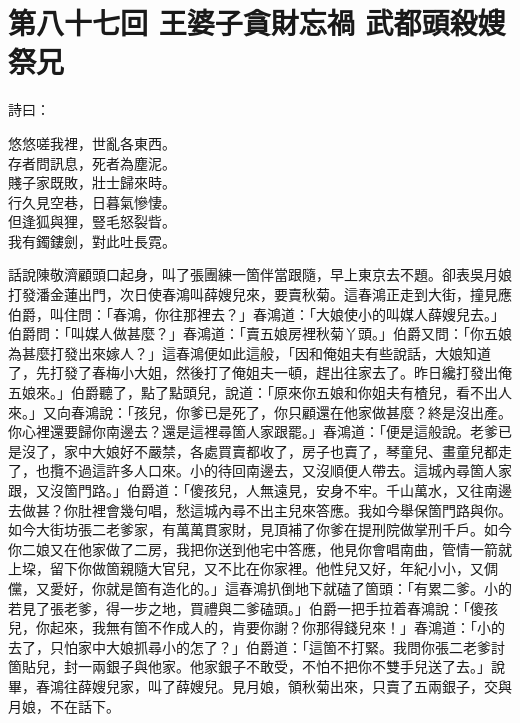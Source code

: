 
\chapter*{第八十七回 王婆子貪財忘禍 武都頭殺嫂祭兄}


詩曰：

\begin{myquote}
悠悠嗟我裡，世亂各東西。\\存者問訊息，死者為塵泥。\\賤子家既敗，壯士歸來時。\\行久見空巷，日暮氣慘悽。\\但逢狐與狸，豎毛怒裂眥。\\我有鐲鏤劍，對此吐長霓。
\end{myquote}

話說陳敬濟顧頭口起身，叫了張團練一箇伴當跟隨，早上東京去不題。卻表吳月娘打發潘金蓮出門，次日使春鴻叫薛嫂兒來，要賣秋菊。這春鴻正走到大街，撞見應伯爵，叫住問：「春鴻，你往那裡去？」春鴻道：「大娘使小的叫媒人薛嫂兒去。」伯爵問：「叫媒人做甚麼？」春鴻道：「賣五娘房裡秋菊丫頭。」伯爵又問：「你五娘為甚麼打發出來嫁人？」這春鴻便如此這般，「因和俺姐夫有些說話，大娘知道了，先打發了春梅小大姐，然後打了俺姐夫一頓，趕出往家去了。昨日纔打發出俺五娘來。」伯爵聽了，點了點頭兒，說道：「原來你五娘和你姐夫有楂兒，看不出人來。」又向春鴻說：「孩兒，你爹已是死了，你只顧還在他家做甚麼？終是沒出產。你心裡還要歸你南邊去？還是這裡尋箇人家跟罷。」春鴻道：「便是這般說。老爹已是沒了，家中大娘好不嚴禁，各處買賣都收了，房子也賣了，琴童兒、畫童兒都走了，也攬不過這許多人口來。小的待回南邊去，又沒順便人帶去。這城內尋箇人家跟，又沒箇門路。」伯爵道：「傻孩兒，人無遠見，安身不牢。{}千山萬水，又往南邊去做甚？你肚裡會幾句唱，愁這城內尋不出主兒來答應。我如今舉保箇門路與你。如今大街坊張二老爹家，有萬萬貫家財，見頂補了你爹在提刑院做掌刑千戶。如今你二娘又在他家做了二房，我把你送到他宅中答應，他見你會唱南曲，管情一箭就上垜，留下你做箇親隨大官兒，又不比在你家裡。他性兒又好，年紀小小，又倜儻，又愛好，你就是箇有造化的。」這春鴻扒倒地下就磕了箇頭：「有累二爹。小的若見了張老爹，得一步之地，買禮與二爹磕頭。」伯爵一把手拉着春鴻說：「傻孩兒，你起來，我無有箇不作成人的，肯要你謝？你那得錢兒來！」春鴻道：「小的去了，只怕家中大娘抓尋小的怎了？」伯爵道：「這箇不打緊。我問你張二老爹討箇貼兒，封一兩銀子與他家。他家銀子不敢受，不怕不把你不雙手兒送了去。」說畢，春鴻往薛嫂兒家，叫了薛嫂兒。見月娘，領秋菊出來，只賣了五兩銀子，交與月娘，不在話下。

